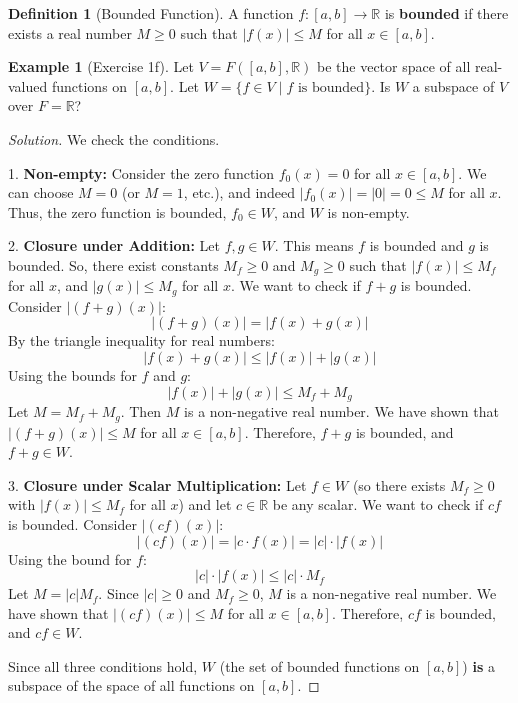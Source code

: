 \documentclass[11pt]{article}
\theoremstyle{definition}
\newtheorem{definition}[theorem]{Definition}
\newtheorem{example}[theorem]{Example}
\theoremstyle{remark}
\begin{document}
\begin{definition}[Bounded Function]
A function $f: [a, b] \to \mathbb{R}$ is \textbf{bounded} if there exists a real number $M \ge 0$ such that $|f(x)| \le M$ for all $x \in [a, b]$.
\end{definition}

\begin{example}[Exercise 1f]
Let $V = F([a, b], \mathbb{R})$ be the vector space of all real-valued functions on $[a, b]$. Let $W = \{ f \in V \mid f \text{ is bounded} \}$. Is $W$ a subspace of $V$ over $F=\mathbb{R}$?

\begin{proof}[Solution]
We check the conditions.

1.  \textbf{Non-empty:} Consider the zero function $f_0(x) = 0$ for all $x \in [a, b]$. We can choose $M=0$ (or $M=1$, etc.), and indeed $|f_0(x)| = |0| = 0 \le M$ for all $x$. Thus, the zero function is bounded, $f_0 \in W$, and $W$ is non-empty.

2.  \textbf{Closure under Addition:} Let $f, g \in W$. This means $f$ is bounded and $g$ is bounded. So, there exist constants $M_f \ge 0$ and $M_g \ge 0$ such that $|f(x)| \le M_f$ for all $x$, and $|g(x)| \le M_g$ for all $x$. We want to check if $f+g$ is bounded. Consider $|(f+g)(x)|$:
    \[ |(f+g)(x)| = |f(x) + g(x)| \]
    By the triangle inequality for real numbers:
    \[ |f(x) + g(x)| \le |f(x)| + |g(x)| \]
    Using the bounds for $f$ and $g$:
    \[ |f(x)| + |g(x)| \le M_f + M_g \]
    Let $M = M_f + M_g$. Then $M$ is a non-negative real number. We have shown that $|(f+g)(x)| \le M$ for all $x \in [a, b]$. Therefore, $f+g$ is bounded, and $f+g \in W$.

3.  \textbf{Closure under Scalar Multiplication:} Let $f \in W$ (so there exists $M_f \ge 0$ with $|f(x)| \le M_f$ for all $x$) and let $c \in \mathbb{R}$ be any scalar. We want to check if $cf$ is bounded. Consider $|(cf)(x)|$:
    \[ |(cf)(x)| = |c \cdot f(x)| = |c| \cdot |f(x)| \]
    Using the bound for $f$:
    \[ |c| \cdot |f(x)| \le |c| \cdot M_f \]
    Let $M = |c| M_f$. Since $|c| \ge 0$ and $M_f \ge 0$, $M$ is a non-negative real number. We have shown that $|(cf)(x)| \le M$ for all $x \in [a, b]$. Therefore, $cf$ is bounded, and $cf \in W$.

Since all three conditions hold, $W$ (the set of bounded functions on $[a,b]$) \textbf{is} a subspace of the space of all functions on $[a,b]$.
\end{proof}
\end{example}
\end{document}
